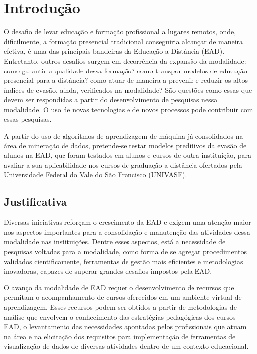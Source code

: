 \chapter{Introdução}

O desafio de levar educação e formação profissional a lugares remotos, onde,
dificilmente, a formação presencial tradicional conseguiria alcançar de maneira
efetiva, é uma das principais bandeiras da Educação a Distância (EAD).
Entretanto, outros desafios surgem em decorrência da expansão da modalidade:
como garantir a qualidade dessa formação? como transpor modelos de educação
presencial para a distância? como atuar de maneira a prevenir e reduzir os altos
índices de evasão, ainda, verificados na modalidade? São questões como essas que
devem ser respondidas a partir do desenvolvimento de pesquisas nessa modalidade.
O uso de novas tecnologias e de novos processos pode contribuir com essas
pesquisas.

A partir do uso de algoritmos de aprendizagem de máquina já consolidados na área
de mineração de dados, pretende-se testar modelos preditivos da evasão de alunos
na EAD, que foram testados em alunos e cursos de outra instituição, para
avaliar a sua aplicabilidade nos cursos de graduação a distância
ofertados pela Universidade Federal do Vale do São Francisco (UNIVASF).

\section{Justificativa}

Diversas iniciativas reforçam o crescimento da EAD e exigem uma atenção maior
nos aspectos importantes para a consolidação e manutenção das atividades dessa
modalidade nas instituições. Dentre esses aspectos, está a necessidade de
pesquisas voltadas para a modalidade, como forma de se agregar procedimentos
validados cientificamente, ferramentas de gestão mais eficientes e metodologias
inovadoras, capazes de superar grandes desafios impostos pela EAD.

O avanço da modalidade de EAD requer o desenvolvimento de recursos que permitam
o acompanhamento de cursos oferecidos em um ambiente virtual de aprendizagem.
Esses recursos podem ser obtidos a partir de metodologias de análise que
envolvem o conhecimento das estratégias pedagógicas dos cursos EAD, o
levantamento das necessidades apontadas pelos profissionais que atuam na área e
na elicitação dos requisitos para implementação de ferramentas de visualização
de dados de diversas atividades dentro de um contexto educacional.
\cite{ramos2016abordagem}

